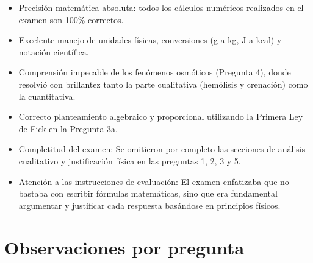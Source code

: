 \documentclass[11pt,a4paper]{article}
\begin{document}
\vspace{4pt}
\begin{minipage}[t]{0.48\linewidth}
  \begin{tcolorbox}[cajaFortaleza, title={Fortalezas}]
\begin{itemize}[leftmargin=1.5em, itemsep=2pt]
  \item Precisión matemática absoluta: todos los cálculos numéricos realizados en el examen son 100\% correctos.
  \item Excelente manejo de unidades físicas, conversiones (g a kg, J a kcal) y notación científica.
  \item Comprensión impecable de los fenómenos osmóticos (Pregunta 4), donde resolvió con brillantez tanto la parte cualitativa (hemólisis y crenación) como la cuantitativa.
  \item Correcto planteamiento algebraico y proporcional utilizando la Primera Ley de Fick en la Pregunta 3a.
\end{itemize}
  \end{tcolorbox}
\end{minipage}
\hfill
\begin{minipage}[t]{0.48\linewidth}
  \begin{tcolorbox}[cajaMejora, title={Areas de mejora}]
\begin{itemize}[leftmargin=1.5em, itemsep=2pt]
  \item Completitud del examen: Se omitieron por completo las secciones de análisis cualitativo y justificación física en las preguntas 1, 2, 3 y 5.
  \item Atención a las instrucciones de evaluación: El examen enfatizaba que no bastaba con escribir fórmulas matemáticas, sino que era fundamental argumentar y justificar cada respuesta basándose en principios físicos.
\end{itemize}
  \end{tcolorbox}
\end{minipage}

\section*{Observaciones por pregunta}
\end{document}
